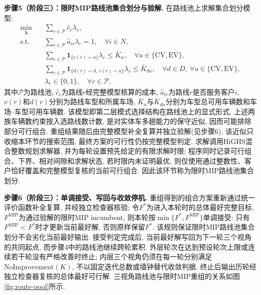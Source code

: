 \documentclass{setp-new}
\begin{document}
\textbf{步骤5（阶段三）：限时MIP路线池集合划分与验解.}
在路线池上求解集合划分模型:
\begin{equation}
\begin{aligned}
\min_{\boldsymbol\lambda}\quad
& \sum_{r\in\mathcal P}\hat c_r\lambda_r,\\
\mathrm{s.t.}\quad
& \sum_{r\in\mathcal P}\hat a_{ir}\lambda_r=1,
  \quad \forall i\in N,\\
& \sum_{r\in\mathcal P}\mathbf 1_{\{v(r)=u\}}\lambda_r\le \bar K_u,
  \quad \forall u\in\{\mathrm{CV},\mathrm{EV}\},\\
& \sum_{r\in\mathcal P}
  \mathbf 1_{\{d(r)=d,\,v(r)=u\}}\lambda_r\le \bar K_{du},
  \quad \forall d\in D,\ \forall u\in\{\mathrm{CV},\mathrm{EV}\},\\
& \lambda_r\in\{0,1\},
  \quad \forall r\in\mathcal P.
\end{aligned}
\label{eq:sp-recombination}
\end{equation}
其中$\mathcal P$为路线池, $\hat c_r$为路线$r$经完整模型核算的成本,
$\hat a_{ir}$为路线$r$是否服务客户$i$, $v(r)$和$d(r)$分别为路线车型和所属车场,
$\bar K_u$与$\bar K_{du}$分别为车型总可用车辆数和车场--车型可用车辆数.
该模型即第二层模式选择结构在路线池上的显式形式.
上述两族车辆数约束按入选路线数计数, 是对实体车多趟能力的保守近似,
因而可能排除部分可行组合. 重组结果随后由完整模型补全复算并独立验解(见步骤6),
该近似只收缩本环节的搜索范围, 最终方案的可行性仍按完整模型判定.
求解调用HiGHS混合整数规划求解器\cite{ref:81}, 并为每轮设置预先给定的有限求解时限;
程序同时记录可行组合、下界、相对间隙和求解状态,
若时限内未证明最优, 则仅使用通过整数性、客户恰好覆盖和完整模型复核的当前可行组合.
因此该环节称为限时MIP路线池集合划分.

\textbf{步骤6（阶段三）：单调接受、写回与收敛停机.}
重组得到的组合方案重新通过统一评价函数补全复算, 并经独立检查器核验;
令$F^*$为进入本轮时的总体最好完整目标, $F^{\mathrm{MIP}}$为通过验解的限时MIP incumbent,
则本轮按$\min\{F^*,F^{\mathrm{MIP}}\}$单调接受:
只有$F^{\mathrm{MIP}}<F^*$时才更新当前最好解, 否则原样保留$F^*$.
该规则保证限时MIP路线池集合划分不会劣化当前最好输出.
接受判定完成后, 当前最好解写回为下一轮三个视角的共同起点,
而步骤4中的路线池继续跨轮累积.
外层轮次在达到预设轮次上限或连续若干轮没有严格改善时终止;
内层三个视角仍须在每一轮分别满足$\mathrm{NoImprovement}(K)$, 不以固定迭代总数或墙钟替代收敛判据.
终止后输出历轮经独立检查器复核的总体最好可行解.
三视角路线池与限时MIP重组的关系如图\ref{fig:route-pool}所示.
\end{document}
